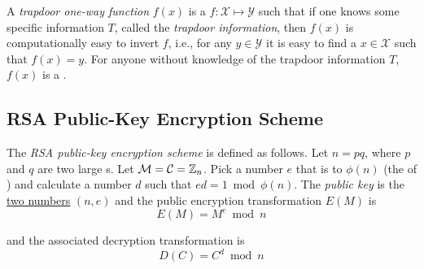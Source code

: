 \begin{definition}\label{def:Trapdoor_One_Way_Function}
  A \emph{trapdoor one-way function} $f(x)$ is a  $f : \mathcal{X} \mapsto \mathcal{Y}$ such that if one knows some specific information $T$, called the \emph{trapdoor information}, then $f(x)$ is computationally easy to invert $f$, i.e., for any $y \in \mathcal{Y}$ it is easy to find a $x \in \mathcal{X}$ such that $f(x) = y$.
  For anyone without knowledge of the trapdoor information $T$, $f(x)$ is a .
\end{definition}

\subsection{RSA Public-Key Encryption Scheme}\label{subsec:RSA_Public_Key_Encryption_Scheme}
\begin{definition}\label{def:RSA_Public_Key_Encryption_Scheme}
  The \emph{RSA public-key encryption scheme} is defined as follows.
  Let $n = pq$, where $p$ and $q$ are two large s.
  Let $\operatorname{\mathcal{M}} = \operatorname{\mathcal{C}} = \operatorname{\mathbb{Z}}_{n}$.
  Pick a number $e$ that is  to $\phi(n)$ (the  of ) and calculate a number $d$ such that $ed = 1 \bmod \phi(n)$.
  The \emph{public key} is the \underline{two numbers} $(n, e)$ and the public encryption transformation $E(M)$ is
  \begin{equation}\label{eq:RSA_Public_Key_Encryption_Scheme-Encryption}
    E(M) = M^{e} \bmod n
  \end{equation}

  and the associated decryption transformation is
  \begin{equation}
    \label{eq:RSA_Public_Key_Encryption_Scheme-Decryption}
    D(C) = C^{d} \bmod n
  \end{equation}
\end{definition}

